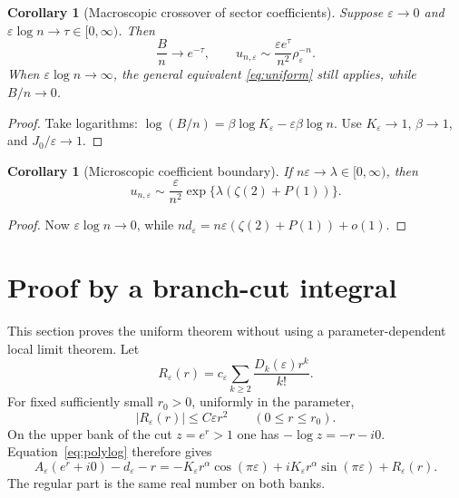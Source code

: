 \documentclass[11pt,a4paper]{article}
\newtheorem{corollary}[theorem]{Corollary}
\theoremstyle{definition}\newtheorem{definition}[theorem]{Definition}
\theoremstyle{remark}\newtheorem{remark}[theorem]{Remark}
\newcommand{\eps}{\varepsilon}
\newcommand{\1}{\mathbf 1}
\begin{document}
\begin{corollary}[Macroscopic crossover of sector coefficients]
\label{cor:window}
Suppose $\eps\to0$ and $\eps\log n\to\tau\in[0,\infty)$. Then
\begin{equation}\label{eq:window}
 \frac Bn\longrightarrow e^{-\tau},\qquad
 u_{n,\eps}\sim \frac{\eps e^{\tau}}{n^2}\rho_{\eps}^{-n}.
\end{equation}
When $\eps\log n\to\infty$, the general equivalent
\eqref{eq:uniform} still applies, while $B/n\to0$.
\end{corollary}
\begin{proof}
Take logarithms:
$\log(B/n)=\beta\log K_{\eps}-\eps\beta\log n$.
Use $K_{\eps}\to1$, $\beta\to1$, and $J_0/\eps\to1$.
\end{proof}

\begin{corollary}[Microscopic coefficient boundary]
\label{cor:microcoeff}
If $n\eps\to\lambda\in[0,\infty)$, then
\begin{equation}\label{eq:microcoeff}
 u_{n,\eps}\sim
 \frac{\eps}{n^2}\exp\{\lambda(\zeta(2)+P(1))\}.
\end{equation}
\end{corollary}
\begin{proof}
Now $\eps\log n\to0$, while
$nd_{\eps}=n\eps(\zeta(2)+P(1))+o(1)$.
\end{proof}

\section{Proof by a branch-cut integral}
\label{sec:hankel}

This section proves the uniform theorem without using a
parameter-dependent local limit theorem. Let
\begin{equation}\label{eq:regularR}
 R_{\eps}(r)=c_{\eps}\sum_{k\ge2}\frac{D_k(\eps)r^k}{k!}.
\end{equation}
For fixed sufficiently small $r_0>0$, uniformly in the parameter,
\begin{equation}\label{eq:Rbound}
 |R_{\eps}(r)|\le C\eps r^2\qquad(0\le r\le r_0).
\end{equation}
On the upper bank of the cut $z=e^r>1$ one has
$-\log z=-r-i0$. Equation~\eqref{eq:polylog} therefore gives
\begin{equation}\label{eq:cutexponent}
 A_{\eps}(e^r+i0)-d_{\eps}-r
 =-K_{\eps}r^{\alpha}\cos(\pi\eps)
   +iK_{\eps}r^{\alpha}\sin(\pi\eps)+R_{\eps}(r).
\end{equation}
The regular part is the same real number on both banks.
\end{document}
